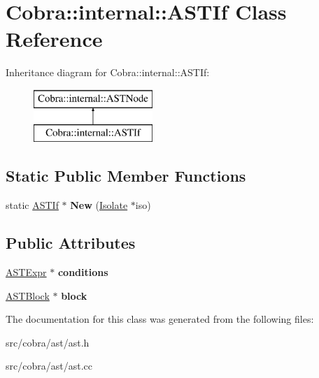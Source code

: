 \hypertarget{class_cobra_1_1internal_1_1_a_s_t_if}{\section{Cobra\+:\+:internal\+:\+:A\+S\+T\+If Class Reference}
\label{class_cobra_1_1internal_1_1_a_s_t_if}
}
Inheritance diagram for Cobra\+:\+:internal\+:\+:A\+S\+T\+If\+:\begin{figure}[H]
\begin{center}
\leavevmode
\includegraphics[height=2.000000cm]{class_cobra_1_1internal_1_1_a_s_t_if}
\end{center}
\end{figure}
\subsection*{Static Public Member Functions}
\begin{DoxyCompactItemize}
\item 
\hypertarget{class_cobra_1_1internal_1_1_a_s_t_if_a43fd97fdb0a7c5854dcc82553dd2e1f6}{static \hyperlink{class_cobra_1_1internal_1_1_a_s_t_if}{A\+S\+T\+If} $\ast$ {\bfseries New} (\hyperlink{class_cobra_1_1internal_1_1_isolate}{Isolate} $\ast$iso)}\label{class_cobra_1_1internal_1_1_a_s_t_if_a43fd97fdb0a7c5854dcc82553dd2e1f6}

\end{DoxyCompactItemize}
\subsection*{Public Attributes}
\begin{DoxyCompactItemize}
\item 
\hypertarget{class_cobra_1_1internal_1_1_a_s_t_if_a8131dd336fcda4d14ee7f6ed6e1a4807}{\hyperlink{class_cobra_1_1internal_1_1_a_s_t_expr}{A\+S\+T\+Expr} $\ast$ {\bfseries conditions}}\label{class_cobra_1_1internal_1_1_a_s_t_if_a8131dd336fcda4d14ee7f6ed6e1a4807}

\item 
\hypertarget{class_cobra_1_1internal_1_1_a_s_t_if_a487d09082eab4efc05cb3415987fc0b9}{\hyperlink{class_cobra_1_1internal_1_1_a_s_t_block}{A\+S\+T\+Block} $\ast$ {\bfseries block}}\label{class_cobra_1_1internal_1_1_a_s_t_if_a487d09082eab4efc05cb3415987fc0b9}

\end{DoxyCompactItemize}


The documentation for this class was generated from the following files\+:\begin{DoxyCompactItemize}
\item 
src/cobra/ast/ast.\+h\item 
src/cobra/ast/ast.\+cc\end{DoxyCompactItemize}

